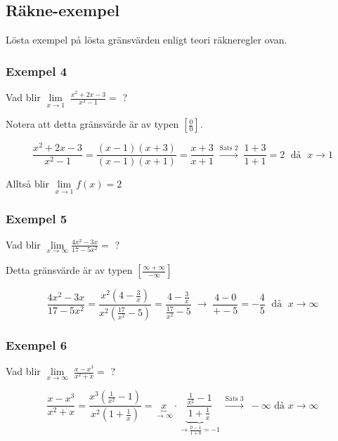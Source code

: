 \documentclass[swedish]{article}
\begin{document}
\pagebreak

\subsection{Räkne-exempel}

Lösta exempel på lösta gränsvärden enligt teori räkneregler ovan. 

\subsubsection{Exempel 4}

Vad blir $\lim\limits_{x \to 1} \; \frac{x^2 + 2x - 3}{x^2 - 1} = $ ?

\smallbreak

Notera att detta gränsvärde är av typen $\left[ \frac{0}{0} \right]$.

$$\frac{x^2 + 2x - 3}{x^2 - 1} = \frac{(x-1)(x+3)}{(x-1)(x+1)} = \frac{x+3}{x+1} \; \xrightarrow{\text{Sats 2}} \; \frac{1+3}{1+1} = 2 \; \text{ då } \; x \to 1$$

Alltså blir $\lim\limits_{x \to 1} f(x) = 2$

\subsubsection{Exempel 5}

Vad blir $\lim\limits_{x \to \infty} \frac{4x^2 - 3x}{17-5x^2} =$ ?

\smallbreak

Detta gränsvärde är av typen $\left[ \frac{\infty + \infty}{- \infty} \right]$

$$\frac{4x^2 - 3x}{17-5x^2} = \frac{x^2(4-\frac{3}{x})}{x^2(\frac{17}{x^2}-5)} = \frac{4-\frac{3}{x}}{\frac{17}{x^2} - 5} \; \to \; \frac{4 - 0}{+ - 5} = -\frac{4}{5} \; \text{ då } \; x \to \infty$$

\subsubsection{Exempel 6}

Vad blir $\lim\limits_{x \to \infty} \; \frac{x - x^3}{x^2 + x} =$ ?

\bigbreak

$$\frac{x-x^3}{x^2+x} = \frac{x^3(\frac{1}{x^2}-1)}{x^2(1+\frac{1}{x})} = \underbrace{x}_{\to \infty} \cdot \underbrace{\frac{\frac{1}{x^2}-1}{1+\frac{1}{x}}}_{\to \frac{0-1}{1+0} = -1} \; \xrightarrow{\text{Sats 3}} \; - \infty \text{ då } x \to \infty$$
\end{document}
